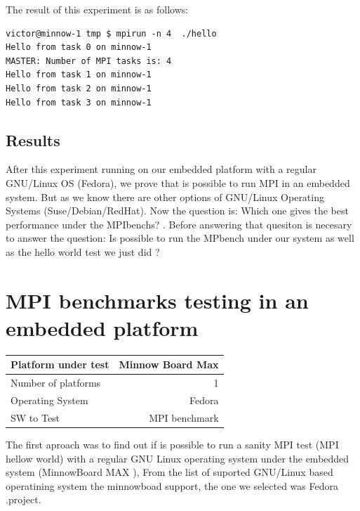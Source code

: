The result of this experiment is as follows:

\begin{minipage}{\textwidth}
\end{minipage}

\begin{minipage}{\textwidth}
\begin{lstlisting}[frame=single]
victor@minnow-1 tmp $ mpirun -n 4  ./hello
Hello from task 0 on minnow-1
MASTER: Number of MPI tasks is: 4
Hello from task 1 on minnow-1
Hello from task 2 on minnow-1
Hello from task 3 on minnow-1
\end{lstlisting}

\end{minipage}

\subsection{Results}

After this experiment running on our embedded platform with a regular GNU/Linux
OS (Fedora), we prove that is possible to run MPI in an embedded system. But as
we know there are other options of GNU/Linux Operating Systems
(Suse/Debian/RedHat). Now the question is: Which one gives the best
performance under the MPIbenchs? . Before answering that quesiton is necesary
to answer the question: Is possible to run the MPbench under our system as well
as the hello world test we just did ?


\section{MPI benchmarks testing in an embedded platform}
    
    \begin{center}
    \begin{tabular}{ | l | r |}
        \hline
        Platform under test & Minnow Board  Max \\ \hline
        Number of platforms  & 1  \\ \hline
        Operating System & Fedora  \\ \hline
        SW to Test & MPI benchmark \\ \hline
    \end{tabular}
    \end{center}

The first aproach was to find out if is possible to run a sanity MPI test (MPI
hellow world) with a regular GNU Linux operating system under the embedded
system (MinnowBoard MAX \cite{minnowboard}),  From the list of suported GNU/Linux
based operatining system the minnowboad support, the one we selected was Fedora
\cite{fedora}.project. 


